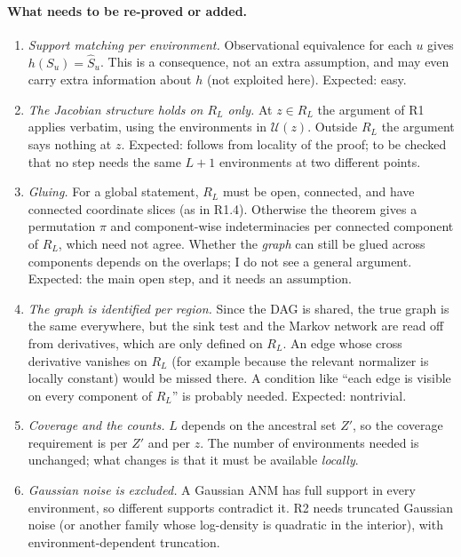 \paragraph{What needs to be re-proved or added.}
\begin{enumerate}[label=(R2.\arabic*),leftmargin=3em]
\item \emph{Support matching per environment.} Observational equivalence for each $u$ gives
      $h(S_u)=\hat S_u$. This is a consequence, not an extra assumption, and may even carry extra information
      about $h$ (not exploited here). Expected: easy.
\item \emph{The Jacobian structure holds on $R_L$ only.} At $z\in R_L$ the argument of R1 applies verbatim,
      using the environments in $\mathcal U(z)$. Outside $R_L$ the argument says nothing at $z$. Expected:
      follows from locality of the proof; to be checked that no step needs the same $L+1$ environments at two
      different points.
\item \emph{Gluing.} For a global statement, $R_L$ must be open, connected, and have connected coordinate
      slices (as in R1.4). Otherwise the theorem gives a permutation $\pi$ and component-wise indeterminacies
      per connected component of $R_L$, which need not agree. Whether the \emph{graph} can still be glued
      across components depends on the overlaps; I do not see a general argument. Expected: the main open
      step, and it needs an assumption.
\item \emph{The graph is identified per region.} Since the DAG is shared, the true graph is the same
      everywhere, but the sink test and the Markov network are read off from derivatives, which are only
      defined on $R_L$. An edge whose cross derivative vanishes on $R_L$ (for example because the relevant
      normalizer is locally constant) would be missed there. A condition like ``each edge is visible on every
      component of $R_L$'' is probably needed. Expected: nontrivial.
\item \emph{Coverage and the counts.} $L$ depends on the ancestral set $Z'$, so the coverage requirement is
      per $Z'$ and per $z$. The number of environments needed is unchanged; what changes is that it must be
      available \emph{locally}.
\item \emph{Gaussian noise is excluded.} A Gaussian ANM has full support in every environment, so
      different supports contradict it. R2 needs truncated Gaussian noise (or another family whose log-density
      is quadratic in the interior), with environment-dependent truncation.
\end{enumerate}

